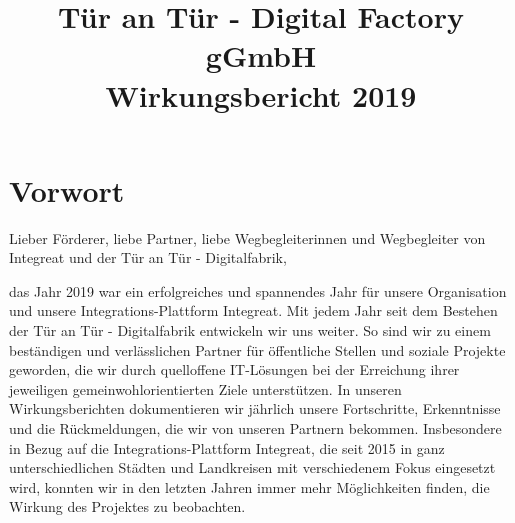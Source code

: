 \documentclass[12pt, a4paper]{article} %
\begin{document}
\title{
Tür an Tür - Digital Factory gGmbH\\
Wirkungsbericht 2019\\
} %

\AddToShipoutPicture*{\BackgroundPic}

\date{}

\maketitle
\thispagestyle{empty} %



\newpage
\tableofcontents

\newpage

\hypertarget{vorwort}{%
\section{Vorwort}\label{vorwort}}

Lieber Förderer, liebe Partner, liebe Wegbegleiterinnen und Wegbegleiter
von Integreat und der Tür an Tür - Digitalfabrik,

das Jahr 2019 war ein erfolgreiches und spannendes Jahr für unsere
Organisation und unsere Integrations-Plattform Integreat. Mit jedem Jahr
seit dem Bestehen der Tür an Tür - Digitalfabrik entwickeln wir uns
weiter. So sind wir zu einem beständigen und verlässlichen Partner für
öffentliche Stellen und soziale Projekte geworden, die wir durch
quelloffene IT-Lösungen bei der Erreichung ihrer jeweiligen
gemeinwohlorientierten Ziele unterstützen. In unseren Wirkungsberichten
dokumentieren wir jährlich unsere Fortschritte, Erkenntnisse und die
Rückmeldungen, die wir von unseren Partnern bekommen. Insbesondere in
Bezug auf die Integrations-Plattform Integreat, die seit 2015 in ganz
unterschiedlichen Städten und Landkreisen mit verschiedenem Fokus
eingesetzt wird, konnten wir in den letzten Jahren immer mehr
Möglichkeiten finden, die Wirkung des Projektes zu beobachten.
\end{document}
